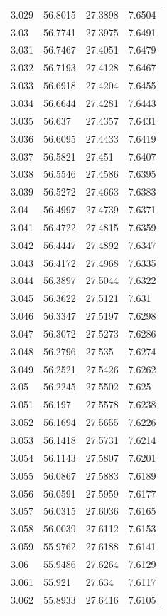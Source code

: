 \begin{tabular}{llll}
3.029 & 56.8015 & 27.3898 & 7.6504 \\
3.03 & 56.7741 & 27.3975 & 7.6491 \\
3.031 & 56.7467 & 27.4051 & 7.6479 \\
3.032 & 56.7193 & 27.4128 & 7.6467 \\
3.033 & 56.6918 & 27.4204 & 7.6455 \\
3.034 & 56.6644 & 27.4281 & 7.6443 \\
3.035 & 56.637 & 27.4357 & 7.6431 \\
3.036 & 56.6095 & 27.4433 & 7.6419 \\
3.037 & 56.5821 & 27.451 & 7.6407 \\
3.038 & 56.5546 & 27.4586 & 7.6395 \\
3.039 & 56.5272 & 27.4663 & 7.6383 \\
3.04 & 56.4997 & 27.4739 & 7.6371 \\
3.041 & 56.4722 & 27.4815 & 7.6359 \\
3.042 & 56.4447 & 27.4892 & 7.6347 \\
3.043 & 56.4172 & 27.4968 & 7.6335 \\
3.044 & 56.3897 & 27.5044 & 7.6322 \\
3.045 & 56.3622 & 27.5121 & 7.631 \\
3.046 & 56.3347 & 27.5197 & 7.6298 \\
3.047 & 56.3072 & 27.5273 & 7.6286 \\
3.048 & 56.2796 & 27.535 & 7.6274 \\
3.049 & 56.2521 & 27.5426 & 7.6262 \\
3.05 & 56.2245 & 27.5502 & 7.625 \\
3.051 & 56.197 & 27.5578 & 7.6238 \\
3.052 & 56.1694 & 27.5655 & 7.6226 \\
3.053 & 56.1418 & 27.5731 & 7.6214 \\
3.054 & 56.1143 & 27.5807 & 7.6201 \\
3.055 & 56.0867 & 27.5883 & 7.6189 \\
3.056 & 56.0591 & 27.5959 & 7.6177 \\
3.057 & 56.0315 & 27.6036 & 7.6165 \\
3.058 & 56.0039 & 27.6112 & 7.6153 \\
3.059 & 55.9762 & 27.6188 & 7.6141 \\
3.06 & 55.9486 & 27.6264 & 7.6129 \\
3.061 & 55.921 & 27.634 & 7.6117 \\
3.062 & 55.8933 & 27.6416 & 7.6105 \\

\end{tabular}
